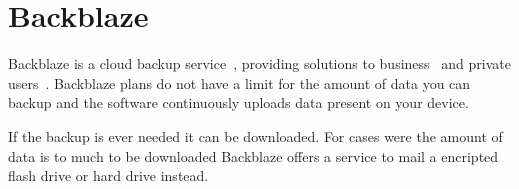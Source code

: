 \section{Backblaze}

Backblaze is a cloud backup service~\cite{hid-sp18-601-www-bblaze-about}, 
providing solutions to business~\cite{hid-sp18-601-www-bblaze-business} and 
private users~\cite{hid-sp18-601-www-bblaze-personal}. Backblaze plans do not
have a limit for the amount of data you can backup and the software continuously 
uploads data present on your device. 

If the backup is ever needed it can be downloaded. For cases were the amount of 
data is to much to be downloaded Backblaze offers a service to mail a encripted 
flash drive or hard drive instead.